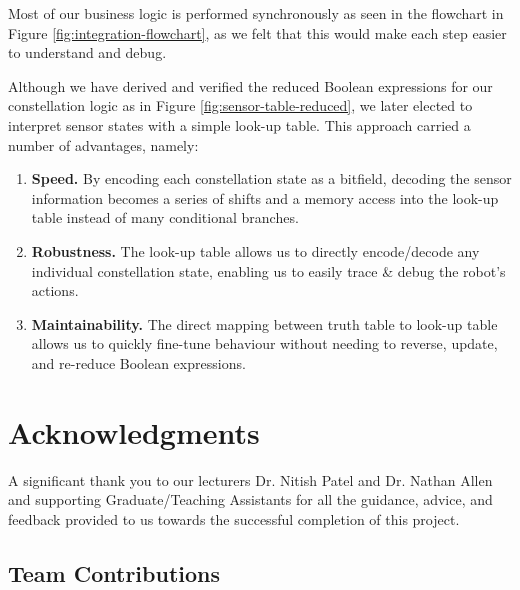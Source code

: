 \documentclass[conference]{IEEEtran}
\begin{document}
Most of our business logic is performed synchronously as seen in the flowchart in Figure \ref{fig:integration-flowchart}, as we felt that this would make each step easier to understand and debug.

Although we have derived and verified the reduced Boolean expressions for our constellation logic as in Figure \ref{fig:sensor-table-reduced}, we later elected to interpret sensor states with a simple look-up table.
This approach carried a number of advantages, namely:
\begin{enumerate}
	\item \textbf{Speed.} By encoding each constellation state as a bitfield, decoding the sensor information becomes a series of shifts and a memory access into the look-up table instead of many conditional branches.
	\item \textbf{Robustness.} The look-up table allows us to directly encode/decode any individual constellation state, enabling us to easily trace \& debug the robot's actions.
	\item \textbf{Maintainability.} The direct mapping between truth table to look-up table allows us to quickly fine-tune behaviour without needing to reverse, update, and re-reduce Boolean expressions.
\end{enumerate}



\section*{Acknowledgments}

A significant thank you to our lecturers Dr. Nitish Patel and Dr. Nathan Allen and supporting Graduate/Teaching Assistants for all the guidance, advice, and feedback provided to us towards the successful completion of this project.




% 
% 



\appendix

\subsection{Team Contributions}
\end{document}
